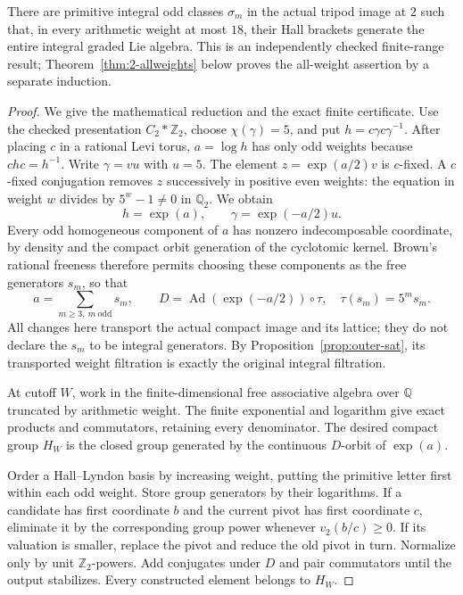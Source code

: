 \begin{theorem}[K17-2-FINITE18]\label{thm:2-finite18}
There are primitive integral odd classes $\sigma_m$ in the actual
tripod image at $2$ such that, in every arithmetic weight at most
$18$, their Hall brackets generate the entire integral graded
Lie algebra. This is an independently checked finite-range result;
Theorem~\ref{thm:2-allweights} below proves the all-weight assertion
by a separate induction.
\end{theorem}

\begin{proof}
We give the mathematical reduction and the exact finite
certificate. Use the checked presentation $C_2*\mathbb Z_2$,
choose $\chi(\gamma)=5$, and put $h=c\gamma c\gamma^{-1}$.
After placing $c$ in a rational Levi torus, $a=\log h$ has only
odd weights because $chc=h^{-1}$. Write $\gamma=v u$ with
$u=5$. The element $z=\exp(a/2)v$ is $c$-fixed. A $c$-fixed
conjugation removes $z$ successively in positive even weights:
the equation in weight $w$ divides by $5^w-1\ne0$ in
$\mathbb Q_2$. We obtain
\[
 h=\exp(a),\qquad \gamma=\exp(-a/2)u.
\]
Every odd homogeneous component of $a$ has nonzero
indecomposable coordinate, by density and the compact orbit
generation of the cyclotomic kernel. Brown's rational freeness
therefore permits choosing these components as the free
generators $s_m$, so that
\[
 a=\sum_{m\ge3,\ m\ {\mathrm{odd}}}s_m,\qquad
 D=\operatorname{Ad}(\exp(-a/2))\circ\tau,
 \quad\tau(s_m)=5^m s_m.
\]
All changes here transport the actual compact image and its
lattice; they do not declare the $s_m$ to be integral generators.
By Proposition~\ref{prop:outer-sat}, its transported weight
filtration is exactly the original integral filtration.

At cutoff $W$, work in the finite-dimensional free associative
algebra over $\mathbb Q$ truncated by arithmetic weight. The
finite exponential and logarithm give exact products and
commutators, retaining every denominator. The desired compact
group $H_W$ is the closed group generated by the continuous
$D$-orbit of $\exp(a)$.

Order a Hall--Lyndon basis by increasing weight, putting the
primitive letter first within each odd weight. Store group
generators by their logarithms. If a candidate has first
coordinate $b$ and the current pivot has first coordinate $c$,
eliminate it by the corresponding group power whenever
$v_2(b/c)\ge0$. If its valuation is smaller, replace the pivot
and reduce the old pivot in turn. Normalize only by unit
$\mathbb Z_2$-powers. Add conjugates under $D$ and pair
commutators until the output stabilizes. Every constructed
element belongs to $H_W$.


\end{proof}
